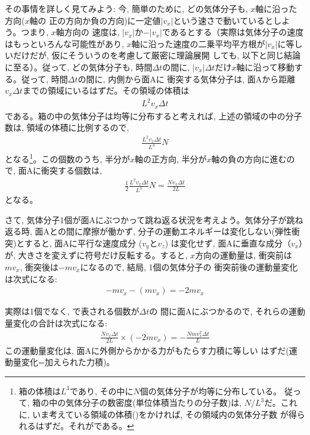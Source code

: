 その事情を詳しく見てみよう: 今, 簡単のために, どの気体分子も, $x$軸に沿った方向($x$軸の
正の方向か負の方向)に一定値$|v_x|$という速さで動いているとしよう。つまり, $x$軸方向の
速度は, $|v_x|$か$-|v_x|$であるとする（実際は気体分子の速度はもっといろんな可能性があり, 
$x$軸に沿った速度の二乗平均平方根が$|v_x|$に等しいだけだが, 仮にそういうのを考慮して厳密に理論展開
しても, 以下と同じ結論に至る）。従って, どの気体分子も, 時間$\Delta t$の間に, 
$|v_x| \Delta t$だけ$x$軸に沿って移動する。従って, 時間$\Delta t$の間に, 内側から面Aに
衝突する気体分子は, 面Aから距離$v_x \Delta t$までの領域にいるはずだ。その領域の体積は
\begin{eqnarray}L^2v_x\Delta t\label{eq:gas_stat_eq_0}\end{eqnarray}
である。箱の中の気体分子は均等に分布すると考えれば, 上述の領域の中の分子数は, 
領域の体積に比例するので, 
\begin{eqnarray}\frac{L^2v_x\Delta t}{L^3}N\label{eq:gas_stat_eq_1}\end{eqnarray}
となる\footnote{箱の体積は$L^3$であり, その中に$N$個の気体分子が均等に分布している。
従って, 箱の中の気体分子の数密度(単位体積当たりの分子数)は, $N/L^3$だ。これに, 
いま考えている領域の体積()をかければ, その領域内の気体分子数
が得られるはずだ。それがである。}。この個数のうち, 
半分が$x$軸の正方向, 半分が$x$軸の負の方向に進むので, 面Aに衝突する個数は, 
\begin{eqnarray}
\frac{1}{2}\frac{L^2v_x\Delta t}{L^3}N=\frac{Nv_x\Delta t}{2L}\label{eq:gas_motion_hitnum}
\end{eqnarray}
となる。

さて, 気体分子1個が面Aにぶつかって跳ね返る状況を考えよう。気体分子が跳ね返る時, 
面Aとの間に摩擦が働かず, 分子の運動エネルギーは変化しない(弾性衝突)とすると, 
面Aに平行な速度成分 ($v_y$と$v_z$) は変化せず, 面Aに垂直な成分（$v_x$）が, 
大きさを変えずに符号だけ反転する。すると, $x$方向の運動量は, 
衝突前は$mv_x$, 衝突後は$-mv_x$になるので, 結局, 1個の気体分子の
衝突前後の運動量変化は次式になる:
\begin{eqnarray}
-mv_x-(mv_x)=-2mv_x\label{eq:gas_motion_changemom}
\end{eqnarray}

実際は1個でなく, で表される個数が$\Delta t$の
間に面Aにぶつかるので, それらの運動量変化の合計は次式になる:
\begin{eqnarray}
\frac{Nv_x\Delta t}{2L}\times(-2mv_x)=-\frac{Nmv_x^2\Delta t}{L}\label{eq:gas_motion_collide}
\end{eqnarray}
この運動量変化は, 面Aに外側からかかる力がもたらす力積に等しい
はずだ(運動量変化=加えられた力積)。

